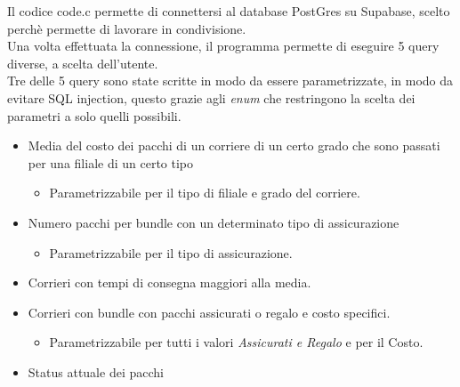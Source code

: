 Il codice code.c permette di connettersi al database PostGres su Supabase, scelto perchè permette di lavorare in condivisione.\\
Una volta effettuata la connessione, il programma permette di eseguire 5 query diverse, a scelta dell'utente.\\
Tre delle 5 query sono state scritte in modo da essere parametrizzate, in modo da evitare SQL injection, questo grazie agli \textit{enum} che restringono la scelta dei parametri a solo quelli possibili.
\begin{itemize}
            \setlength{\itemindent}{+.2in}
            \item Media del costo dei pacchi di un corriere di un certo grado che sono passati per una filiale di un certo tipo
                \begin{itemize}
                    \setlength{\itemindent}{+.2in}
                        \item Parametrizzabile per il tipo di filiale e grado del corriere.
                \end{itemize}
            \item Numero pacchi per bundle con un determinato tipo di assicurazione
                \begin{itemize}
                    \setlength{\itemindent}{+.2in}
                        \item Parametrizzabile per il tipo di assicurazione.
                \end{itemize}
            \item Corrieri con tempi di consegna maggiori alla media.
            \item Corrieri con bundle con pacchi assicurati o regalo e costo specifici.
                \begin{itemize}
                    \setlength{\itemindent}{+.2in}
                        \item Parametrizzabile per tutti i valori \textit{Assicurati e Regalo} e per il Costo.
                \end{itemize}
            \item Status attuale dei pacchi
\end{itemize}